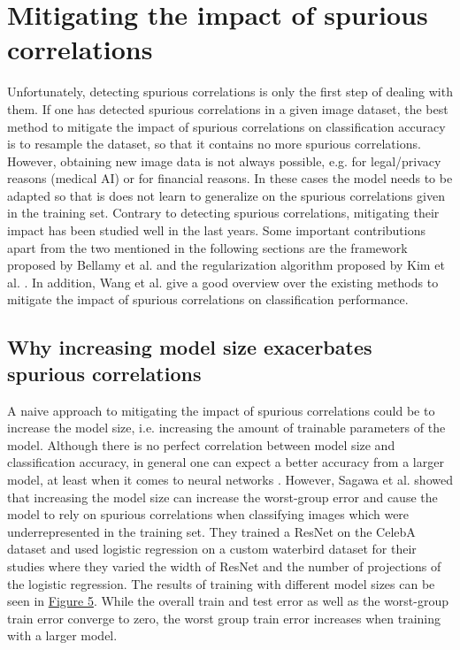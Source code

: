 \documentclass{article}
\begin{document}
\section{Mitigating the impact of spurious correlations}
\label{sec:mitigatingscs}
Unfortunately, detecting spurious correlations is only the first step of dealing with them. If one has detected
spurious correlations in a given image dataset, the best method to mitigate the impact of spurious correlations
on classification accuracy is to resample the dataset, so that it contains no more spurious correlations.
However, obtaining new image data is not always possible, e.g. for legal/privacy reasons (medical AI) or for
financial reasons. In these cases the model needs to be adapted so that is does not learn to generalize on the
spurious correlations given in the training set. Contrary to detecting spurious correlations, mitigating their
impact has been studied well in the last years. Some important contributions apart from the two mentioned in
the following sections are the framework proposed by Bellamy et al. \cite{bellamy2018ai} and the regularization
algorithm proposed by Kim et al. \cite{Kim_2019_CVPR}. In addition, Wang et al. \cite{Wang_2020_CVPR} give a
good overview over the existing methods to mitigate the impact of spurious correlations on classification performance.


\subsection{Why increasing model size exacerbates spurious correlations}
A naive approach to mitigating the impact of spurious correlations could be to increase the model size, i.e. increasing
the amount of trainable parameters of the model. Although there is no perfect correlation between model size and
classification accuracy, in general one can expect a better accuracy from a larger model, at least when it comes
to neural networks \cite{8395231}. However, Sagawa et al. \cite{pmlr-v119-sagawa20a} showed that increasing the
model size can increase the worst-group error and cause the model to rely on spurious correlations when classifying
images which were underrepresented in the training set. They trained a ResNet \cite{He_2016_CVPR} on the CelebA dataset \cite{liu2015faceattributes} and
used logistic regression on a custom waterbird dataset for their studies where they varied the width of ResNet and the number of projections of
the logistic regression. The results of training with different model sizes can be seen in \hyperref[fig:sagawaImg]{Figure 5}. While the overall train
and test error as well as the worst-group train error converge to zero, the worst group train error increases when training with a larger model. 
\end{document}
